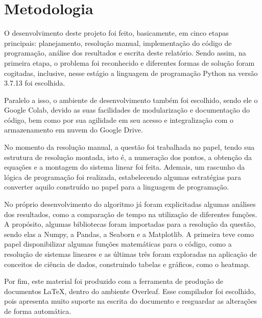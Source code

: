 \documentclass[a4paper,11pt]{article}
\begin{document}
\pagebreak

\section{Metodologia}
    O desenvolvimento deste projeto foi feito, basicamente, em cinco etapas principais: planejamento, resolução manual, implementação do código de programação, análise dos resultados e escrita deste relatório. Sendo assim, na primeira etapa, o problema foi reconhecido e diferentes formas de solução foram cogitadas, inclusive, nesse estágio a linguagem de programação Python na versão 3.7.13 foi escolhida. 
    
    Paralelo a isso, o ambiente de desenvolvimento também foi escolhido, sendo ele o Google Colab, devido as suas facilidades de modularização e documentação do código, bem como por sua agilidade em seu acesso e integralização com o armazenamento em nuvem do Google Drive.
    
    No momento da resolução manual, a questão foi trabalhada no papel, tendo sua estrutura de resolução montada, isto é, a numeração dos pontos, a obtenção da equações e a montagem do sistema linear foi feita. Ademais, um rascunho da lógica de programação foi realizada, estabelecendo algumas estratégias para converter aquilo construído no papel para a linguagem de programação.
    
    No próprio desenvolvimento do algoritmo já foram explicitadas algumas análises dos resultados, como a comparação de tempo na utilização de diferentes funções. A propósito, algumas bibliotecas foram importadas para a resolução da questão, sendo elas a Numpy, a Pandas, a Seaborn e a Matplotlib. A primeira teve como papel disponibilizar algumas funções matemáticas para o código, como a resolução de sistemas lineares e as últimas três foram exploradas na aplicação de conceitos de ciência de dados, construindo tabelas e gráficos, como o heatmap.
    
    Por fim, este material foi produzido com a ferramenta de produção de documentos LaTeX, dentro do ambiente Overleaf. Esse compilador foi escolhido, pois apresenta muito suporte na escrita do documento e resguardar as alterações de forma automática.
    
\pagebreak
\end{document}
